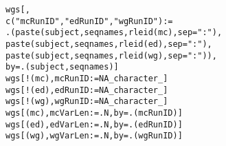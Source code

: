\documentclass{article}\usepackage[]{graphicx}\usepackage[]{color}
\makeatletter
\newcommand{\hlnum}[1]{\textcolor[rgb]{0.063,0.58,0.627}{#1}}%
\newcommand{\hlstr}[1]{\textcolor[rgb]{0.063,0.58,0.627}{#1}}%
\newcommand{\hlopt}[1]{\textcolor[rgb]{0.196,0.196,0.196}{#1}}%
\newcommand{\hlstd}[1]{\textcolor[rgb]{0.196,0.196,0.196}{#1}}%
\newcommand{\hlkwb}[1]{\textcolor[rgb]{0.627,0,0.314}{#1}}%
\newcommand{\hlkwc}[1]{\textcolor[rgb]{0,0.631,0.314}{#1}}%
\newcommand{\hlkwd}[1]{\textcolor[rgb]{0.78,0.227,0.412}{#1}}%
\newenvironment{kframe}{%
 \def\at@end@of@kframe{}%
 \ifinner\ifhmode%
  \def\at@end@of@kframe{\end{minipage}}%
  \begin{minipage}{\columnwidth}%
 \fi\fi%
 \def\FrameCommand##1{\hskip\@totalleftmargin \hskip-\fboxsep
 \colorbox{shadecolor}{##1}\hskip-\fboxsep
     \hskip-\linewidth \hskip-\@totalleftmargin \hskip\columnwidth}%
 \MakeFramed {\advance\hsize-\width
   \@totalleftmargin\z@ \linewidth\hsize
   \@setminipage}}%
 {\par\unskip\endMakeFramed%
 \at@end@of@kframe}
\newenvironment{knitrout}{}{} %
\makeatother
\begin{document}
\begin{knitrout}
\color{fgcolor}\begin{kframe}
\begin{alltt}
\hlstd{wgs[ ,}
    \hlkwd{c}\hlstd{(}\hlstr{"mcRunID"}\hlstd{,} \hlstr{"edRunID"}\hlstd{,} \hlstr{"wgRunID"}\hlstd{)} \hlkwb{:=}
      \hlkwd{.}\hlstd{(}\hlkwd{paste}\hlstd{(subject, seqnames,} \hlkwd{rleid}\hlstd{(mc),} \hlkwc{sep} \hlstd{=} \hlstr{":"}\hlstd{),}
        \hlkwd{paste}\hlstd{(subject, seqnames,} \hlkwd{rleid}\hlstd{(ed),} \hlkwc{sep} \hlstd{=} \hlstr{":"}\hlstd{),}
        \hlkwd{paste}\hlstd{(subject, seqnames,} \hlkwd{rleid}\hlstd{(wg),} \hlkwc{sep} \hlstd{=} \hlstr{":"}\hlstd{)),}
    \hlkwc{by} \hlstd{=} \hlkwd{.}\hlstd{(subject, seqnames)]}
\hlstd{wgs[}\hlopt{!}\hlstd{(mc), mcRunID} \hlkwb{:=} \hlnum{NA_character_}\hlstd{]}
\hlstd{wgs[}\hlopt{!}\hlstd{(ed), edRunID} \hlkwb{:=} \hlnum{NA_character_}\hlstd{]}
\hlstd{wgs[}\hlopt{!}\hlstd{(wg), wgRunID} \hlkwb{:=} \hlnum{NA_character_}\hlstd{]}
\hlstd{wgs[(mc), mcVarLen} \hlkwb{:=} \hlstd{.N,} \hlkwc{by} \hlstd{=} \hlkwd{.}\hlstd{(mcRunID)]}
\hlstd{wgs[(ed), edVarLen} \hlkwb{:=} \hlstd{.N,} \hlkwc{by} \hlstd{=} \hlkwd{.}\hlstd{(edRunID)]}
\hlstd{wgs[(wg), wgVarLen} \hlkwb{:=} \hlstd{.N,} \hlkwc{by} \hlstd{=} \hlkwd{.}\hlstd{(wgRunID)]}


\end{alltt}
\end{kframe}
\end{knitrout}
\end{document}
